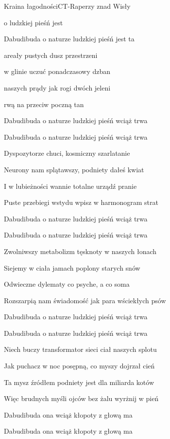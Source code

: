 \documentclass[a4paper,draft]{book}
\begin{document}
\begin{song}{Kraina łagodności}{C}{}{T-Raperzy znad Wisły}{}{}
	\begin{SBChorus}
	 o  ludzkiej pieśń jest 

	Dabudibuda o naturze ludzkiej pieśń jest ta
	\end{SBChorus}
	\begin{SBVerse}
	 areały pustych dusz przestrzeni

	 w glinie uczuć ponadczasowy dzban

	 naszych prądy jak rogi dwóch jeleni

	 rwą na przeciw  poczną tan
	\end{SBVerse}
	\begin{SBChorus}
	Dabudibuda o naturze ludzkiej pieśń wciąż trwa

	Dabudibuda o naturze ludzkiej pieśń wciąż trwa
	\end{SBChorus}
	\begin{SBVerse}
	Dyspozytorze chuci, kosmiczny szarlatanie

	Neurony nam splątawszy, podniety dałeś kwiat

	I w lubieżności wannie totalne urządź pranie

	Puste przebiegi wstydu wpisz w harmonogram strat
	\end{SBVerse}
	\begin{SBChorus}
	Dabudibuda o naturze ludzkiej pieśń wciąż trwa

	Dabudibuda o naturze ludzkiej pieśń wciąż trwa
	\end{SBChorus}
	\begin{SBVerse}
	Zwolniwszy metabolizm tęsknoty w naszych łonach

	Siejemy w ciała jamach poplony starych snów

	Odwieczne dylematy co psyche, a co soma

	Rozszarpią nam świadomość jak para wściekłych psów
	\end{SBVerse}
	\begin{SBChorus}
	Dabudibuda o naturze ludzkiej pieśń wciąż trwa

	Dabudibuda o naturze ludzkiej pieśń wciąż trwa
	\end{SBChorus}
	\begin{SBVerse}
	Niech buczy transformator sieci ciał naszych splotu

	Jak puchacz w noc posępną, co myszy dojrzał cień

	Ta mysz źródłem podniety jest dla miliarda kotów

	Więc brudnych myśli ojców bez żalu wyrżnij w pień
	\end{SBVerse}
	\begin{SBChorus}
	Dabudibuda ona wciąż kłopoty z głową ma

	Dabudibuda ona wciąż kłopoty z głową ma
	\end{SBChorus}
\end{song}
\end{document}
